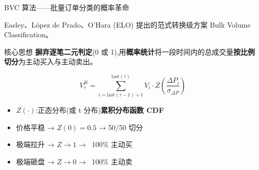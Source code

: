 \documentclass[10pt,aspectratio=169]{beamer}
\begin{document}
\begin{frame}{BVC 算法——批量订单分类的概率革命}

  Easley、López de Prado、O'Hara (ELO) 提出的\alert{范式转换}级方案 Bulk Volume Classification。

  \begin{block}{核心思想}
    \textbf{摒弃逐笔二元判定}(0 或 1),用\textbf{概率统计}将一段时间内的总成交量\textbf{按比例切分}为主动买入与主动卖出。
  \end{block}

  \vfill

  \[
    V_\tau^B = \sum_{i = \text{last}(\tau-1)+1}^{\text{last}(\tau)} V_i \cdot Z\!\left(\frac{\Delta P_i}{\sigma_{\Delta P}}\right)
  \]

  \begin{itemize}
    \item $Z(\cdot)$:正态分布(或 t 分布)\textbf{累积分布函数 CDF}
    \item 价格平稳 → $Z(0) = 0.5$ → 50/50 切分
    \item 极端拉升 → $Z \to 1$ → ~100\% 主动买
    \item 极端砸盘 → $Z \to 0$ → ~100\% 主动卖
  \end{itemize}

\end{frame}
\end{document}
